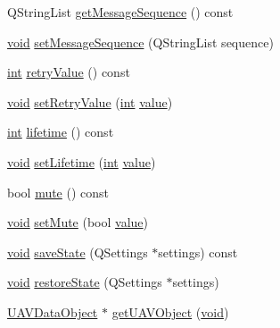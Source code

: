 \begin{DoxyCompactItemize}
\item 
Q\-String\-List \hyperlink{group__notifyplugin_gad9a4c112e8b27294870f09c7c3bf6bd8}{get\-Message\-Sequence} () const 
\item 
\hyperlink{group___u_a_v_objects_plugin_ga444cf2ff3f0ecbe028adce838d373f5c}{void} \hyperlink{group__notifyplugin_gad8bface53f8c0b678ba53efa7607c644}{set\-Message\-Sequence} (Q\-String\-List sequence)
\item 
\hyperlink{ioapi_8h_a787fa3cf048117ba7123753c1e74fcd6}{int} \hyperlink{group__notifyplugin_gad3ef16c40fa24c6362f0a5b8dcf7106a}{retry\-Value} () const 
\item 
\hyperlink{group___u_a_v_objects_plugin_ga444cf2ff3f0ecbe028adce838d373f5c}{void} \hyperlink{group__notifyplugin_gace1ba5eab850d1945aeede024e405463}{set\-Retry\-Value} (\hyperlink{ioapi_8h_a787fa3cf048117ba7123753c1e74fcd6}{int} \hyperlink{glext_8h_aa0e2e9cea7f208d28acda0480144beb0}{value})
\item 
\hyperlink{ioapi_8h_a787fa3cf048117ba7123753c1e74fcd6}{int} \hyperlink{group__notifyplugin_ga2a7280994bcb9184ba2a3de6aa2d9dd7}{lifetime} () const 
\item 
\hyperlink{group___u_a_v_objects_plugin_ga444cf2ff3f0ecbe028adce838d373f5c}{void} \hyperlink{group__notifyplugin_gab8ee00149d5b8c0a74ff7fc134bdbd4c}{set\-Lifetime} (\hyperlink{ioapi_8h_a787fa3cf048117ba7123753c1e74fcd6}{int} \hyperlink{glext_8h_aa0e2e9cea7f208d28acda0480144beb0}{value})
\item 
bool \hyperlink{group__notifyplugin_ga815fa2051096a7c2f3074c60afad5d47}{mute} () const 
\item 
\hyperlink{group___u_a_v_objects_plugin_ga444cf2ff3f0ecbe028adce838d373f5c}{void} \hyperlink{group__notifyplugin_ga45781a8ec6285e780f592f1b3952b407}{set\-Mute} (bool \hyperlink{glext_8h_aa0e2e9cea7f208d28acda0480144beb0}{value})
\item 
\hyperlink{group___u_a_v_objects_plugin_ga444cf2ff3f0ecbe028adce838d373f5c}{void} \hyperlink{group__notifyplugin_ga9ba0eb664828ae93d16faaa783b77cfc}{save\-State} (Q\-Settings $\ast$settings) const 
\item 
\hyperlink{group___u_a_v_objects_plugin_ga444cf2ff3f0ecbe028adce838d373f5c}{void} \hyperlink{group__notifyplugin_gad7dea9a755d75cd820f3b06131f52a1d}{restore\-State} (Q\-Settings $\ast$settings)
\item 
\hyperlink{class_u_a_v_data_object}{U\-A\-V\-Data\-Object} $\ast$ \hyperlink{group__notifyplugin_ga5f16bd85e4ffd982c71b75abbb00833d}{get\-U\-A\-V\-Object} (\hyperlink{group___u_a_v_objects_plugin_ga444cf2ff3f0ecbe028adce838d373f5c}{void})

\end{DoxyCompactItemize}
